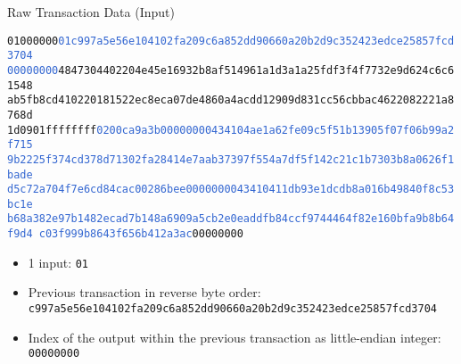 \documentclass[]{beamer}
\begin{document}
\begin{frame}{Raw Transaction Data (Input)}
\begin{scriptsize}
\texttt{01000000\textcolor{highlight}{01c997a5e56e104102fa209c6a852dd90660a20b2d9c352423edce25857fcd3704
00000000}\textcolor{focus}{4847304402204e45e16932b8af514961a1d3a1a25fdf3f4f7732e9d624c6c61548
ab5fb8cd410220181522ec8eca07de4860a4acdd12909d831cc56cbbac4622082221a8768d
1d0901}ffffffff\textcolor{highlight}{0200ca9a3b00000000434104ae1a62fe09c5f51b13905f07f06b99a2f715
9b2225f374cd378d71302fa28414e7aab37397f554a7df5f142c21c1b7303b8a0626f1bade
d5c72a704f7e6cd84cac00286bee0000000043410411db93e1dcdb8a016b49840f8c53bc1e
b68a382e97b1482ecad7b148a6909a5cb2e0eaddfb84ccf9744464f82e160bfa9b8b64f9d4
c03f999b8643f656b412a3ac}00000000}
\end{scriptsize}
\vspace{1em}
\scriptsize
\begin{itemize}
	\item 1 input: \texttt{01}
	\item Previous transaction in reverse byte order: \texttt{c997a5e56e104102fa209c6a852dd90660a20b2d9c352423edce25857fcd3704}
	\item Index of the output within the previous transaction as little-endian integer: \texttt{00000000}
\end{itemize}
\end{frame}
\end{document}
